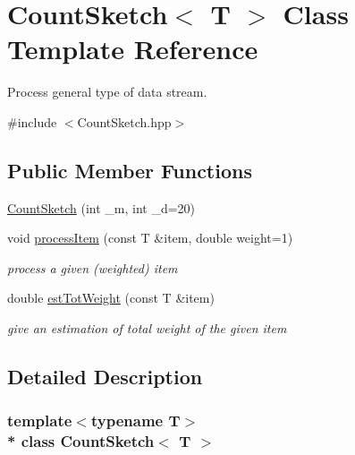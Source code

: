 \hypertarget{classCountSketch}{}\section{Count\+Sketch$<$ T $>$ Class Template Reference}
\label{classCountSketch}


Process general type of data stream.  




{\ttfamily \#include $<$Count\+Sketch.\+hpp$>$}

\subsection*{Public Member Functions}
\begin{DoxyCompactItemize}
\item 
\hyperlink{classCountSketch_a7fce7d2503fbd2735d21e2263011b98e}{Count\+Sketch} (int \+\_\+m, int \+\_\+d=20)
\item 
void \hyperlink{classCountSketch_acd783350ba445753b2d64cd87bbae236}{process\+Item} (const T \&item, double weight=1)\hypertarget{classCountSketch_acd783350ba445753b2d64cd87bbae236}{}\label{classCountSketch_acd783350ba445753b2d64cd87bbae236}

\begin{DoxyCompactList}\small\item\em process a given (weighted) item \end{DoxyCompactList}\item 
double \hyperlink{classCountSketch_aac4e2082b912799cd9ca83f35c0a4000}{est\+Tot\+Weight} (const T \&item)\hypertarget{classCountSketch_aac4e2082b912799cd9ca83f35c0a4000}{}\label{classCountSketch_aac4e2082b912799cd9ca83f35c0a4000}

\begin{DoxyCompactList}\small\item\em give an estimation of total weight of the given item \end{DoxyCompactList}\end{DoxyCompactItemize}


\subsection{Detailed Description}
\subsubsection*{template$<$typename T$>$\\*
class Count\+Sketch$<$ T $>$}

